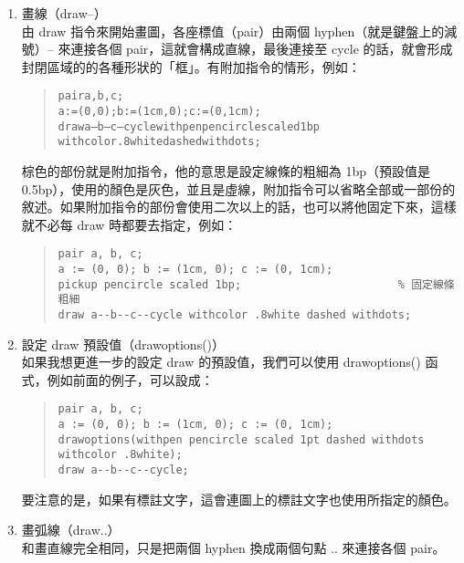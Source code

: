 \begin{enumerate}
  \item 畫線（{\ttfamily draw--}）\\
        由 {\ttfamily draw} 指令來開始畫圖，各座標值（pair）由兩個 hyphen（就是鍵盤上的減號）{\ttfamily --} 來連接各個 pair，這就會構成直線，最後連接至 {\ttfamily cycle} 的話，就會形成封閉區域的的各種形狀的「框」。有附加指令的情形，例如：

        \begin{quote}
          \begin{alltt}
            pair a, b, c;
            a := (0, 0); b := (1cm, 0); c := (0, 1cm);
            draw a--b--c--cycle \textcolor{RawSienna}{withpen pencircle scaled 1bp
              withcolor .8white dashed withdots};
          \end{alltt}
        \end{quote}

        棕色的部份就是附加指令，他的意思是設定線條的粗細為 1bp（預設值是 0.5bp），使用的顏色是灰色，並且是虛線，附加指令可以省略全部或一部份的敘述。如果附加指令的部份會使用二次以上的話，也可以將他固定下來，這樣就不必每 {\ttfamily draw} 時都要去指定，例如：

        \begin{quote}
          \begin{verbatim}
pair a, b, c;
a := (0, 0); b := (1cm, 0); c := (0, 1cm);
pickup pencircle scaled 1bp;                        % 固定線條粗細
draw a--b--c--cycle withcolor .8white dashed withdots;
\end{verbatim}
        \end{quote}

  \item 設定 {\ttfamily draw} 預設值（{\ttfamily drawoptions()}）\\
        如果我想更進一步的設定 {\ttfamily draw} 的預設值，我們可以使用 {\ttfamily drawoptions()} 函式，例如前面的例子，可以設成：

        \begin{quote}
          \begin{verbatim}
pair a, b, c; 
a := (0, 0); b := (1cm, 0); c := (0, 1cm);
drawoptions(withpen pencircle scaled 1pt dashed withdots withcolor .8white);
draw a--b--c--cycle;
\end{verbatim}
        \end{quote}

        要注意的是，如果有標註文字，這會連圖上的標註文字也使用所指定的顏色。

  \item 畫弧線（{\ttfamily draw..}）\\
        和畫直線完全相同，只是把兩個 hyphen 換成兩個句點 {\ttfamily ..} 來連接各個 pair。


\end{enumerate}
